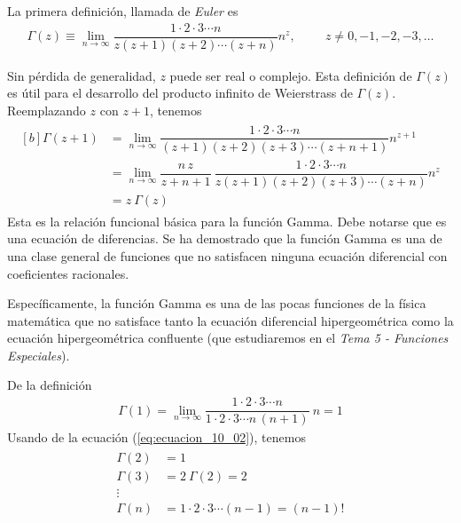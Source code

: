 La primera definición, llamada de \emph{Euler} es
\begin{align}
\Gamma(z) \equiv \lim_{n \to \infty} \dfrac{1 \cdot 2 \cdot 3 \cdots n}{z (z+1) (z+2) \cdots (z+n)} n^{z}, \hspace{1cm} z \neq 0, -1,-2,-3, \ldots
\label{eq:ecuacion_10_01}
\end{align}

Sin pérdida de generalidad, $z$ puede ser real o complejo.  Esta definición de $\Gamma(z)$ es útil para el desarrollo del producto infinito de Weierstrass de $\Gamma (z)$. Reemplazando $z$ con $z + 1$, tenemos
\begin{align}
\begin{aligned}[b]
\Gamma (z + 1) &= \lim_{n \to \infty} \dfrac{1 \cdot 2 \cdot 3 \cdots n}{(z + 1)(z + 2)(z + 3) \cdots (z + n + 1)} n^{z + 1} \\[0.5em]
&= \lim_{n \to \infty} \dfrac{n \, z}{z + n + 1} \: \dfrac{1 \cdot 2 \cdot 3 \cdots n}{z (z + 1)(z + 2)(z + 3) \cdots (z + n)} n^{z} \\[0.5em]
&= z \: \Gamma (z)
\label{eq:ecuacion_10_02}
\end{aligned}
\end{align}
Esta es la relación funcional básica para la función Gamma. Debe notarse que es una ecuación de diferencias. Se ha demostrado que la función Gamma es una de una clase general de funciones que no satisfacen ninguna ecuación diferencial con coeficientes racionales.
\par
Específicamente, la función Gamma es una de las pocas funciones de la física matemática que no satisface tanto la ecuación diferencial hipergeométrica como la ecuación hipergeométrica confluente (que estudiaremos en el \emph{Tema 5 - Funciones Especiales}).
\par
De la definición
\begin{align}
\Gamma (1) = \lim_{n \to \infty} \dfrac{1 \cdot 2 \cdot 3 \cdots n}{1 \cdot 2 \cdot 3 \cdots n \, (n + 1)} \: n = 1
\label{eq:ecuacion_10_03}
\end{align}
Usando de la ecuación (\ref{eq:ecuacion_10_02}), tenemos
\begin{align}
\begin{aligned}
\Gamma (2) &= 1 \\
\Gamma (3) &=  2 \: \Gamma(2) =  2 \\
\vdots \\
\Gamma (n) &= 1 \cdot 2 \cdot 3 \cdots (n-1) =  (n-1)!
\label{eq:ecuacion_10_04}
\end{aligned}
\end{align}

